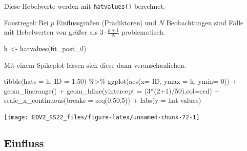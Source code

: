 \documentclass[
]{book}
\newenvironment{Shaded}{\begin{snugshade}}{\end{snugshade}}
\newcommand{\AttributeTok}[1]{\textcolor[rgb]{0.77,0.63,0.00}{#1}}
\newcommand{\DecValTok}[1]{\textcolor[rgb]{0.00,0.00,0.81}{#1}}
\newcommand{\FunctionTok}[1]{\textcolor[rgb]{0.00,0.00,0.00}{#1}}
\newcommand{\NormalTok}[1]{#1}
\newcommand{\OtherTok}[1]{\textcolor[rgb]{0.56,0.35,0.01}{#1}}
\newcommand{\SpecialCharTok}[1]{\textcolor[rgb]{0.00,0.00,0.00}{#1}}
\newcommand{\StringTok}[1]{\textcolor[rgb]{0.31,0.60,0.02}{#1}}
\begin{document}
Diese Hebelwerte werden mit \texttt{hatvalues()} berechnet.

Faustregel: Bei \(p\) Einflussgrößen (Prädiktoren) und \(N\) Beobachtungen sind Fälle mit Hebelwerten von größer als \(3 \cdot \frac{p+1}N\) problematisch.

\begin{Shaded}
\begin{Highlighting}[]
\NormalTok{h }\OtherTok{\textless{}{-}} \FunctionTok{hatvalues}\NormalTok{(fit\_post\_il)}
\end{Highlighting}
\end{Shaded}

Mit einem Spikeplot lassen sich diese dann veranschaulichen.

\begin{Shaded}
\begin{Highlighting}[]
\FunctionTok{tibble}\NormalTok{(}\AttributeTok{hats =}\NormalTok{ h,}
       \AttributeTok{ID =} \DecValTok{1}\SpecialCharTok{:}\DecValTok{50}\NormalTok{) }\SpecialCharTok{\%\textgreater{}\%} 
  \FunctionTok{ggplot}\NormalTok{(}\FunctionTok{aes}\NormalTok{(}\AttributeTok{x=}\NormalTok{ ID, }\AttributeTok{ymax =}\NormalTok{ h, }\AttributeTok{ymin=} \DecValTok{0}\NormalTok{)) }\SpecialCharTok{+}
  \FunctionTok{geom\_linerange}\NormalTok{() }\SpecialCharTok{+}
  \FunctionTok{geom\_hline}\NormalTok{(}\AttributeTok{yintercept =}\NormalTok{ (}\DecValTok{3}\SpecialCharTok{*}\NormalTok{(}\DecValTok{2}\SpecialCharTok{+}\DecValTok{1}\NormalTok{)}\SpecialCharTok{/}\DecValTok{50}\NormalTok{),}\AttributeTok{col=}\StringTok{\textquotesingle{}red\textquotesingle{}}\NormalTok{) }\SpecialCharTok{+}
  \FunctionTok{scale\_x\_continuous}\NormalTok{(}\AttributeTok{breaks =} \FunctionTok{seq}\NormalTok{(}\DecValTok{0}\NormalTok{,}\DecValTok{50}\NormalTok{,}\DecValTok{5}\NormalTok{)) }\SpecialCharTok{+}
  \FunctionTok{labs}\NormalTok{(}\AttributeTok{y =} \StringTok{\textquotesingle{}hat{-}values\textquotesingle{}}\NormalTok{)}
\end{Highlighting}
\end{Shaded}

\begin{center}\texttt{[image: EDV2\_SS22\_files/figure-latex/unnamed-chunk-72-1]} \end{center}

\hypertarget{einfluss}{%
\subsection{Einfluss}\label{einfluss}}
\end{document}
